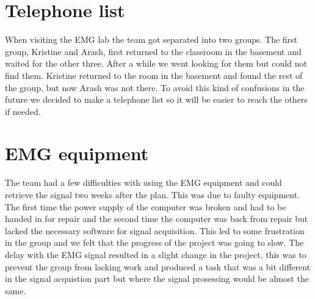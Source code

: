 \section{Telephone list}
When visiting the EMG lab the team got separated into two groups. The first group, Kristine and Arash, first returned to the classroom in the basement and waited for the other three. After a while we went looking for them but could not find them. Kristine returned to the room in the basement and found the rest of the group, but now Arash was not there. To avoid this kind of confusions in the future we decided to make a telephone list so it will be easier to reach the others if needed.

\section{EMG equipment}
The team had a few difficulties with using the EMG equipment and could retrieve the signal two weeks after the plan. This was due to faulty equipment. The first time the power supply of the computer was broken and had to be handed in for repair and the second time the computer was back from repair but lacked the necessary software for signal acquisition. This led to some frustration in the group and we felt that the progress of the project was going to slow. The delay with the EMG signal resulted in a slight change in the project, this was to prevent the group from lacking work and produced a task that was a bit different in the signal acquistion part but where the signal prosessing would be almost the same.

